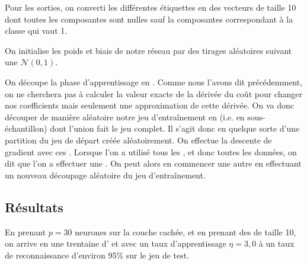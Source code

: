 Pour les sorties, on converti les différentes étiquettes 
en des vecteurs de taille 10 dont toutes les composantes 
sont nulles sauf la composantes correspondant à la classe 
qui vaut 1.

On initialise les poids et biais de notre réseau par des 
tirages aléatoires suivant une $\mathcal{N}(0, 1)$.

On découpe la phase d'apprentissage en . 
Comme nous l'avons dit précédemment, on ne cherchera pas 
à calculer la valeur exacte de la dérivée du coût 
pour changer nos coefficients mais seulement une 
approximation de cette dérivée.
On va donc découper de manière aléatoire notre jeu 
d'entraînement en  (i.e. en sous-échantillon) 
dont l'union fait le jeu complet.
Il s'agit donc en quelque sorte d'une partition du 
jeu de départ créée aléatoirement.
On effectue la descente de gradient avec ces 
. 
Lorsque l'on a utilisé tous les , 
et donc toutes les données, on dit que l'on a 
effectuer une .
On peut alors en commencer une autre en effectuant un 
nouveau découpage aléatoire du jeu d'entraînement.


\subsection{Résultats}


En prenant $p = 30$ neurones sur la couche cachée, et 
en prenant des  de taille 10, 
on arrive en une trentaine d' et avec 
un taux d'apprentissage $\eta = 3,0$ à un taux de 
reconnaissance d'environ 95\% sur le jeu de test.
